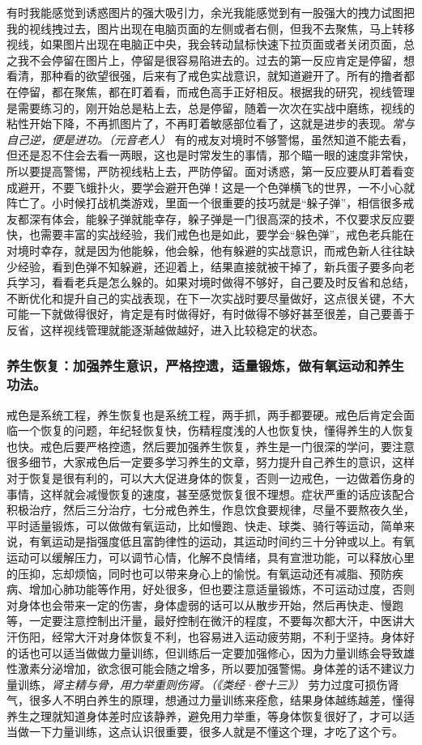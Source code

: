 有时我能感觉到诱惑图片的强大吸引力，余光我能感觉到有一股强大的拽力试图把我的视线拽过去，图片出现在电脑页面的左侧或者右侧，但我不去聚焦，马上转移视线，如果图片出现在电脑正中央，我会转动鼠标快速下拉页面或者关闭页面，总之我不会停留在图片上，停留是很容易陷进去的。过去的第一反应肯定是停留，想看清，那种看的欲望很强，后来有了戒色实战意识，就知道避开了。所有的撸者都在停留，都在聚焦，都在盯着看，而戒色高手正好相反。根据我的研究，视线管理是需要练习的，刚开始总是粘上去，总是停留，随着一次次在实战中磨练，视线的粘性开始下降，不再抓图片了，不再盯着敏感部位看了，这就是进步的表现。\textit{常与自己逆，便是进功。（元音老人）} 有的戒友对境时不够警惕，虽然知道不能去看，但还是忍不住会去看一两眼，这也是时常发生的事情，那个瞄一眼的速度非常快，所以要提高警惕，严防视线粘上去，严防停留。面对诱惑，第一反应要从盯着看变成避开，不要飞蛾扑火，要学会避开色弹！这是一个色弹横飞的世界，一不小心就阵亡了。小时候打战机类游戏，里面一个很重要的技巧就是“躲子弹”，相信很多戒友都深有体会，能躲子弹就能幸存，躲子弹是一门很高深的技术，不仅要求反应要快，也需要丰富的实战经验，我们戒色也是如此，要学会“躲色弹”，戒色老兵能在对境时幸存，就是因为他能躲，他会躲，他有躲避的实战意识，而戒色新人往往缺少经验，看到色弹不知躲避，还迎着上，结果直接就被干掉了，新兵蛋子要多向老兵学习，看看老兵是怎么躲的。如果对境时做得不够好，自己要及时反省和总结，不断优化和提升自己的实战表现，在下一次实战时要尽量做好，这点很关键，不大可能一下就做得很好，肯定是有时做得好，有时做得不够好甚至很差，自己要善于反省，这样视线管理就能逐渐越做越好，进入比较稳定的状态。

\subsubsection{养生恢复：加强养生意识，严格控遗，适量锻炼，做有氧运动和养生功法。}

戒色是系统工程，养生恢复也是系统工程，两手抓，两手都要硬。戒色后肯定会面临一个恢复的问题，年纪轻恢复快，伤精程度浅的人也恢复快，懂得养生的人恢复也快。戒色后要严格控遗，然后要加强养生恢复，养生是一门很深的学问，要注意很多细节，大家戒色后一定要多学习养生的文章，努力提升自己养生的意识，这样对于恢复是很有利的，可以大大促进身体的恢复，否则一边戒色，一边做着伤身的事情，这样就会减慢恢复的速度，甚至感觉恢复很不理想。症状严重的话应该配合积极治疗，然后三分治疗，七分戒色养生，作息饮食要规律，尽量不要熬夜久坐，平时适量锻炼，可以做做有氧运动，比如慢跑、快走、球类、骑行等运动，简单来说，有氧运动是指强度低且富韵律性的运动，其运动时间约三十分钟或以上。有氧运动可以缓解压力，可以调节心情，化解不良情绪，具有宣泄功能，可以释放心里的压抑，忘却烦恼，同时也可以带来身心上的愉悦。有氧运动还有减脂、预防疾病、增加心肺功能等作用，好处很多，但也要注意适量锻炼，不可运动过度，否则对身体也会带来一定的伤害，身体虚弱的话可以从散步开始，然后再快走、慢跑等，一定要注意控制出汗量，最好控制在微汗的程度，不要每次都大汗，中医讲大汗伤阳，经常大汗对身体恢复不利，也容易进入运动疲劳期，不利于坚持。身体好的话也可以适当做做力量训练，但训练后一定要加强修心，因为力量训练会导致雄性激素分泌增加，欲念很可能会随之增多，所以要加强警惕。身体差的话不建议力量训练，\textit{肾主精与骨，用力举重则伤肾。（《类经·卷十三》）} 劳力过度可损伤肾气，很多人不明白养生的原理，想通过力量训练来痊愈，结果身体越练越差，懂得养生之理就知道身体差时应该静养，避免用力举重，等身体恢复很好了，才可以适当做一下力量训练，这点认识很重要，很多人就是不懂这个理，才吃了这个亏。

